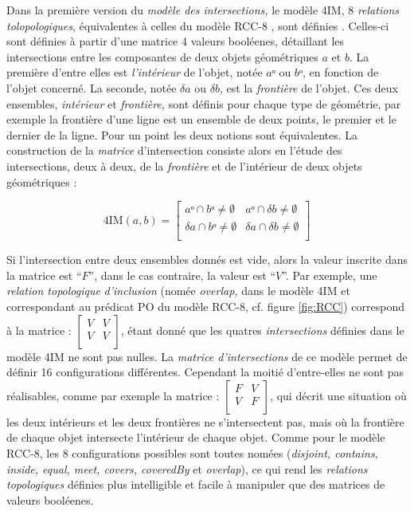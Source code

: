 Dans la première version du \emph{modèle des intersections,} le modèle
4IM, 8 \emph{relations tolopologiques}, équivalentes à celles du
modèle RCC-8 \autocite{Duchene2019}, sont définies
\textcite{Egenhofer1989,Egenhofer1990,Egenhofer1991a}. Celles-ci sont
définies à partir d'une matrice 4 valeurs booléenes, détaillant les
intersections entre les composantes de deux objets géométriques \(a\)
et \(b\). La première d'entre elles est \emph{l'intérieur} de l'objet,
notée \(aᵒ\) ou \(bᵒ\), en fonction de l'objet concerné. La seconde,
notée \(δa\) ou \(δb\), est la \emph{frontière} de l'objet. Ces deux
ensembles, \emph{intérieur} et \emph{frontière,} sont définis pour
chaque type de géométrie, par exemple la frontière d'une ligne est un
ensemble de deux points, le premier et le dernier de la ligne. Pour un
point les deux notions sont équivalentes. La construction de la
\emph{matrice }d'intersection consiste alors en l'étude des
intersections, deux à deux, de la \emph{frontière} et de l'intérieur
de deux objets géométriques :

\begin{equation}
  \label{eq:matrice_4IM}
  \text{4IM}(a,b) =
  \begin{bmatrix}
    aᵒ ∩ bᵒ ≠ ∅ & aᵒ ∩ δb ≠ ∅ \\
    δa ∩ bᵒ ≠ ∅ & δa ∩ δb ≠ ∅ \\
  \end{bmatrix}
\end{equation}

Si l'intersection entre deux ensembles donnés est vide, alors la
valeur inscrite dans la matrice est \enquote{\(F\)}, dans le cas
contraire, la valeur est \enquote{\(V\)}. Par exemple, une
\emph{relation topologique} \emph{d'inclusion} (nomée \emph{overlap,}
dans le modèle 4IM et correspondant au prédicat PO du modèle RCC-8,
cf. figure \ref{fig:RCC}) correspond à la matrice :
%
\(\left[
  \begin{smallmatrix}
    V&V\\
    V&V\\
  \end{smallmatrix}
\right]\),
%
étant donné que les quatres \emph{intersections} définies dans le
modèle 4IM ne sont pas nulles. La \emph{matrice d'intersections} de ce
modèle permet de définir 16 configurations différentes. Cependant la
moitié d'entre-elles ne sont pas réalisables, comme par exemple la
matrice :
%
\(\left[
  \begin{smallmatrix}
    F&V\\
    V&F\\
  \end{smallmatrix}
\right]\),
%
qui décrit une situation où les deux intérieurs et les deux frontières
ne s'intersectent pas, mais où la frontière de chaque objet intersecte
l'intérieur de chaque objet. Comme pour le modèle RCC-8, les 8
configurations possibles sont toutes nomées (\emph{disjoint, contains,
  inside, equal, meet, covers, coveredBy} et \emph{overlap}), ce qui
rend les \emph{relations topologiques} définies plus intelligible et
facile à manipuler que des matrices de valeurs booléenes.


